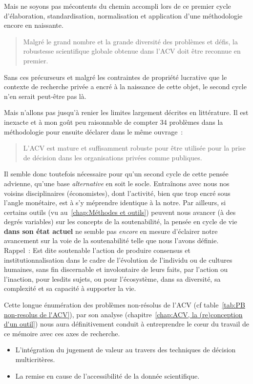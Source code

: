 Mais ne soyons pas mécontents du chemin accompli lors de ce premier cycle d'élaboration, standardisation, normalisation et application d'une méthodologie encore en naissante. %
\blockcquote[traduction]{klopffer_background_2014}{
Malgré le grand nombre et la grande diversité des problèmes et défis, la robustesse scientifique globale obtenue dans l'ACV doit être reconnue en premier.
}
Sans ces précurseurs et malgré les contraintes de propriété lucrative que le contexte de recherche privée a encré à la naissance de cette objet, le second cycle n'en serait peut-être pas là.

Mais n'allons pas jusqu'à renier les limites largement décrites en littérature.
Il est inexacte et à mon goût peu raisonnable de compter 34 problèmes dans la méthodologie pour ensuite déclarer dans le même ouvrage~:
\blockcquote[traduction, p.204]{klopffer_background_2014}{
L'ACV est mature et suffisamment robuste pour être utilisée pour la prise de décision dans les organisations privées comme publiques.
}
Il semble donc toutefois nécessaire pour qu'un second cycle de cette pensée advienne, qu'une base \emph{alternative} en soit le socle. %
Entraînons avec nous nos voisins disciplinaires (économistes), dont l'activité, bien que trop encré sous l'angle monétaire, est à s'y méprendre identique à la notre.
Par ailleurs, si certains outils (vu au~\ref{chap:Méthodes et outils}) peuvent nous avancer (à des degrés variables) sur les concepts de la soutenabilité, la pensée en cycle de vie \textbf{dans son état actuel} ne semble pas \textit{encore} en mesure d'éclairer notre avancement sur la voie de la soutenabilité telle que nous l'avons définie.\\ %
Rappel~: Est dite soutenable l'action de produire consensus et institutionnalisation dans le cadre de l'évolution de l'individu ou de cultures humaines, sans fin discernable et involontaire de leurs faits, par l'action ou l'inaction, pour lesdits sujets, ou pour l'écosystème, dans sa diversité, sa complexité et sa capacité à supporter la vie.

Cette longue énumération des problèmes non-résolus de l'ACV (cf table~\ref{tab:PB non-resolus de l'ACV}), par son analyse (chapitre~\ref{chap:ACV, la (re)conception d'un outil}) nous aura définitivement conduit à entreprendre le cœur du travail de ce mémoire avec ces axes de recherche.
\begin{itemize}[noitemsep]
\item L'intégration du jugement de valeur au travers des techniques de décision multicritères.
\item La remise en cause de l'accessibilité de la donnée scientifique.
\end{itemize}

